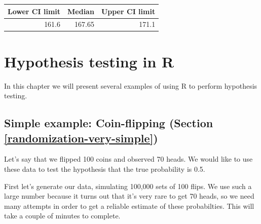 \documentclass[12pt,]{book}
\begin{document}
\begin{tabular}{r|r|r}
\hline
Lower CI limit & Median & Upper CI limit\\
\hline
161.6 & 167.65 & 171.1\\
\hline
\end{tabular}

\hypertarget{hypothesis-testing-in-r}{%
\chapter{Hypothesis testing in R}\label{hypothesis-testing-in-r}}

In this chapter we will present several examples of using R to perform hypothesis testing.

\hypertarget{simple-example-coin-flipping-section-refrandomization-very-simple}{%
\section{Simple example: Coin-flipping (Section \ref{randomization-very-simple})}\label{simple-example-coin-flipping-section-refrandomization-very-simple}}

Let's say that we flipped 100 coins and observed 70 heads. We would like to use these data to test the hypothesis that the true probability is 0.5.

First let's generate our data, simulating 100,000 sets of 100 flips. We use such a large number because it turns out that it's very rare to get 70 heads, so we need many attempts in order to get a reliable estimate of these probabilties. This will take a couple of minutes to complete.
\end{document}
